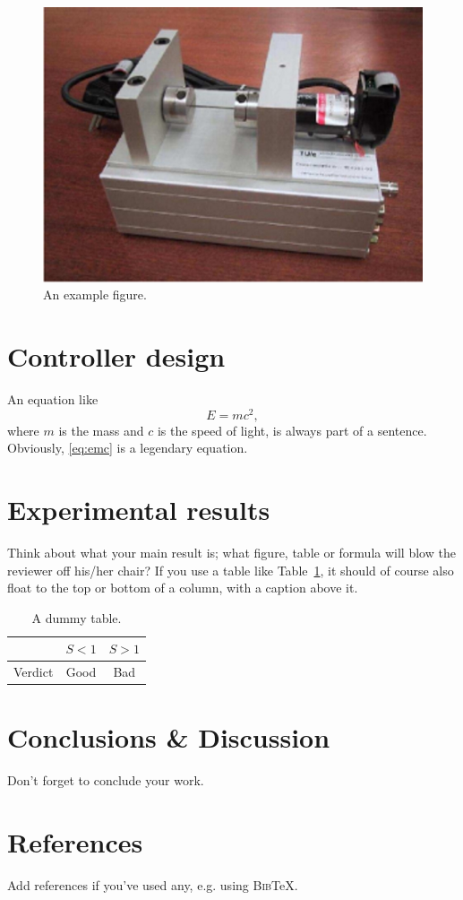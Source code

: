 \documentclass[a4paper,10pt,conference]{ieeeconf}
\begin{document}
\begin{figure}[b]
\centering
\includegraphics[width=0.9\linewidth]{FORCE.jpg}
\caption{An example figure.}
\label{fig:example}
\end{figure}


\newpage

\section{\textbf{Controller design}}

An equation like
\begin{equation}\label{eq:emc}
  E=mc^2,
\end{equation}
where $m$ is the mass and $c$ is the speed of light, is always part of a sentence. Obviously, \eqref{eq:emc} is a legendary equation.



\section{\textbf{Experimental results}}

Think about what your main result is; what figure, table or formula will blow the reviewer off his/her chair? If you use a table like Table~\ref{tab:goodbad}, it should of course also float to the top or bottom of a column, with a caption above it.

\begin{table}
\centering
\caption{A dummy table.}
\label{tab:goodbad}
\begin{tabular}{|c|c|c|}
\hline
& $S<1$ & $S>1$ \\
\hline
Verdict & Good & Bad \\
\hline
\end{tabular}
\end{table}

\section{\textbf{Conclusions \& Discussion}}
Don't forget to conclude your work.


\section*{\textbf{References}}
Add references if you've used any, e.g. using \textsc{Bib}\TeX.
\end{document}
